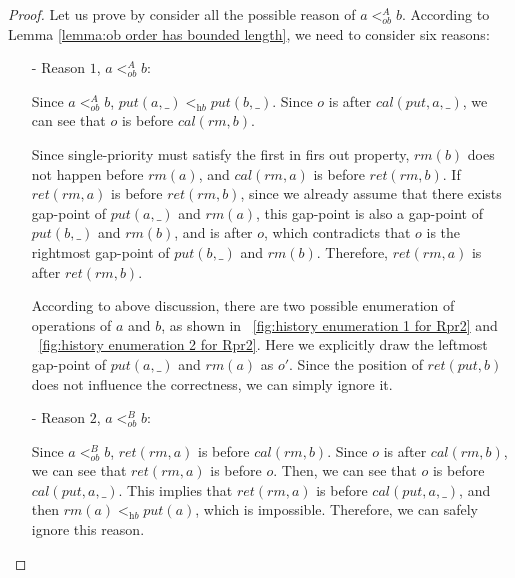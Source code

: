 \documentclass{llncs}
\begin{document}
\begin {proof}

Let us prove by consider all the possible reason of $a <_{\textit{ob}}^A b$. According to Lemma \ref{lemma:ob order has bounded length}, we need to consider six reasons: %

\begin{itemize}
\setlength{\itemsep}{0.5pt}
\item[-] Reason $1$, $a <_{\textit{ob}}^A b$:

    Since $a <_{\textit{ob}}^A b$, $\textit{put}(a,\_) <_{\textit{hb}} \textit{put}(b,\_)$. Since $o$ is after $\textit{cal}(\textit{put},a,\_)$, we can see that $o$ is before $\textit{cal}(\textit{rm},b)$.

    Since single-priority must satisfy the first in firs out property, $\textit{rm}(b)$ does not happen before $\textit{rm}(a)$, and $\textit{cal}(\textit{rm},a)$ is before $\textit{ret}(\textit{rm},b)$. If $\textit{ret}(\textit{rm},a)$ is before $\textit{ret}(\textit{rm},b)$, since we already assume that there exists gap-point of $\textit{put}(a,\_)$ and $\textit{rm}(a)$, this gap-point is also a gap-point of $\textit{put}(b,\_)$ and $\textit{rm}(b)$, and is after $o$, which contradicts that $o$ is the rightmost gap-point of $\textit{put}(b,\_)$ and $\textit{rm}(b)$. Therefore, $\textit{ret}(\textit{rm},a)$ is after $\textit{ret}(\textit{rm},b)$.

    According to above discussion, there are two possible enumeration of operations of $a$ and $b$, as shown in \figurename~\ref{fig:history enumeration 1 for Rpr2} and \figurename~\ref{fig:history enumeration 2 for Rpr2}. Here we explicitly draw the leftmost gap-point of $\textit{put}(a,\_)$ and $\textit{rm}(a)$ as $o'$. Since the position of $\textit{ret}(\textit{put},b)$ does not influence the correctness, we can simply ignore it.

\item[-] Reason $2$, $a <_{\textit{ob}}^B b$:

    Since $a <_{\textit{ob}}^B b$, $\textit{ret}(\textit{rm},a)$ is before $\textit{cal}(\textit{rm},b)$. Since $o$ is after $\textit{cal}(\textit{rm},b)$, we can see that $\textit{ret}(\textit{rm},a)$ is before $o$. Then, we can see that $o$ is before $\textit{cal}(\textit{put},a,\_)$. This implies that $\textit{ret}(\textit{rm},a)$ is before $\textit{cal}(\textit{put},a,\_)$, and then $\textit{rm}(a) <_{\textit{hb}} \textit{put}(a)$, which is impossible. Therefore, we can safely ignore this reason.


\end{itemize}
\end{proof}
\end{document}
